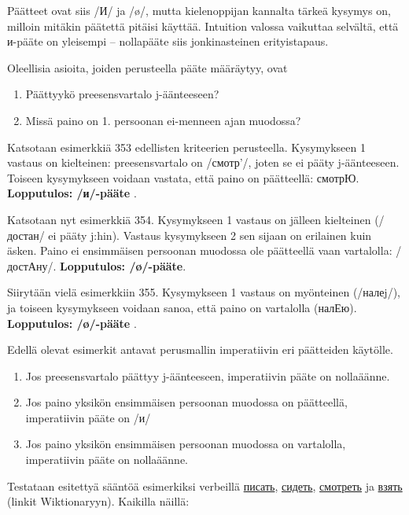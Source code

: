 \documentclass[]{scrreprt}
\providecommand{\tightlist}{%
  \setlength{\itemsep}{0pt}\setlength{\parskip}{0pt}}
\begin{document}
Päätteet ovat siis /И/ ja /ø/, mutta kielenoppijan kannalta tärkeä
kysymys on, milloin mitäkin päätettä pitäisi käyttää. Intuition valossa
vaikuttaa selvältä, että и-pääte on yleisempi -- nollapääte siis
jonkinasteinen erityistapaus.

Oleellisia asioita, joiden perusteella pääte määräytyy, ovat

\begin{enumerate}
\def\labelenumi{\arabic{enumi}.}
\tightlist
\item
  Päättyykö preesensvartalo j-äänteeseen?
\item
  Missä paino on 1. persoonan ei-menneen ajan muodossa?
\end{enumerate}

Katsotaan esimerkkiä 353 edellisten kriteerien perusteella. Kysymykseen
1 vastaus on kielteinen: preesensvartalo on /смотр'/, joten se ei pääty
j-äänteeseen. Toiseen kysymykseen voidaan vastata, että paino on
päätteellä: смотрЮ. \textbf{Lopputulos: /и/-pääte} .

Katsotaan nyt esimerkkiä 354. Kysymykseen 1 vastaus on jälleen
kielteinen (/достан/ ei pääty j:hin). Vastaus kysymykseen 2 sen sijaan
on erilainen kuin äsken. Paino ei ensimmäisen persoonan muodossa ole
päätteellä vaan vartalolla: /достАну/. \textbf{Lopputulos: /ø/-pääte}.

Siirytään vielä esimerkkiin 355. Kysymykseen 1 vastaus on myönteinen
(/налеj/), ja toiseen kysymykseen voidaan sanoa, että paino on
vartalolla (налЕю). \textbf{Lopputulos: /ø/-pääte} .

Edellä olevat esimerkit antavat perusmallin imperatiivin eri päätteiden
käytölle.

\begin{enumerate}
\def\labelenumi{\arabic{enumi}.}
\tightlist
\item
  Jos preesensvartalo päättyy j-äänteeseen, imperatiivin pääte on
  nollaäänne.
\item
  Jos paino yksikön ensimmäisen persoonan muodossa on päätteellä,
  imperatiivin pääte on /и/
\item
  Jos paino yksikön ensimmäisen persoonan muodossa on vartalolla,
  imperatiivin pääte on nollaäänne.
\end{enumerate}

Testataan esitettyä sääntöä esimerkiksi verbeillä
\href{http://ru.wiktionary.org/wiki/\%D0\%BF\%D0\%B8\%D1\%81\%D0\%B0\%D1\%82\%D1\%8C}{писать},
\href{http://ru.wiktionary.org/wiki/\%D1\%81\%D0\%B8\%D0\%B4\%D0\%B5\%D1\%82\%D1\%8C}{сидеть},
\href{http://ru.wiktionary.org/wiki/\%D1\%81\%D0\%BC\%D0\%BE\%D1\%82\%D1\%80\%D0\%B5\%D1\%82\%D1\%8C}{смотреть}
ja
\href{http://ru.wiktionary.org/wiki/\%D0\%B2\%D0\%B7\%D1\%8F\%D1\%82\%D1\%8C}{взять}
(linkit Wiktionaryyn). Kaikilla näillä:
\end{document}
